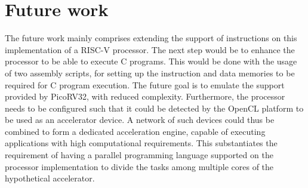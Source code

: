 \section{Future work}
\label{sect7_2}
The future work mainly comprises extending the support of instructions on this implementation of a RISC-V processor. The next step would be to enhance the processor to be able to execute C programs. This would be done with the usage of two assembly scripts, for setting up the instruction and data memories to be required for C program execution. The future goal is to emulate the support provided by PicoRV32, with reduced complexity. \newline\newline
Furthermore, the processor needs to be configured such that it could be detected by the OpenCL platform to be used as an accelerator device. A network of such devices could thus be combined to form a dedicated acceleration engine, capable of executing applications with high computational requirements. This substantiates the requirement of having a parallel programming language supported on the processor implementation to divide the tasks among multiple cores of the hypothetical accelerator.

